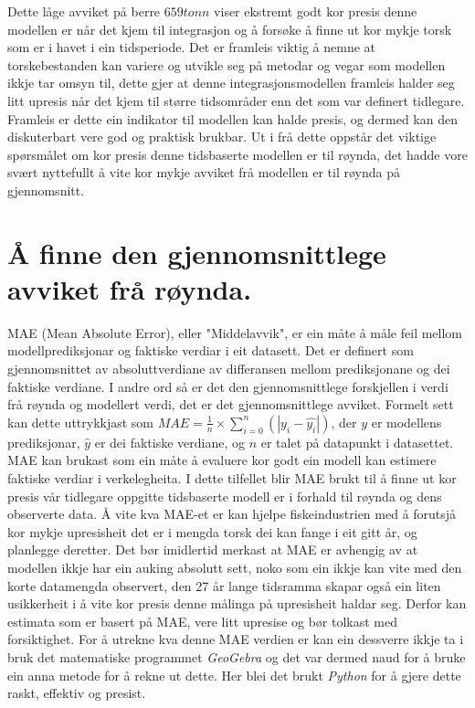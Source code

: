 \documentclass{report}
\begin{document}
Dette låge avviket på berre $659tonn$ viser ekstremt godt kor presis denne modellen er når det kjem til integrasjon og å forsøke å finne ut kor mykje torsk som er i havet i ein tidsperiode.
Det er framleis viktig å nemne at torskebestanden kan variere og utvikle seg på metodar og vegar som modellen ikkje tar omsyn til, dette gjer at denne integrasjonsmodellen framleis halder seg litt upresis når det kjem til større tidsområder enn det som var definert tidlegare.
Framleis er dette ein indikator til modellen kan halde presis, og dermed kan den diskuterbart vere god og praktisk brukbar.
Ut i frå dette oppstår det viktige spørsmålet om kor presis denne tidsbaserte modellen er til røynda, det hadde vore svært nyttefullt å vite kor mykje avviket frå modellen er til røynda på gjennomsnitt.
\section{Å finne den gjennomsnittlege avviket frå røynda.}
MAE (Mean Absolute Error), eller "Middelavvik", er ein måte å måle feil mellom modellprediksjonar og faktiske verdiar i eit datasett.
Det er definert som gjennomsnittet av absoluttverdiane av differansen mellom prediksjonane og dei faktiske verdiane.
I andre ord så er det den gjennomsnittlege forskjellen i verdi frå røynda og modellert verdi, det er det gjennomsnittlege avviket.
Formelt sett kan dette uttrykkjast som $MAE = \frac{1}{n}\times \sum_{i=0}^{n}(|y_i - \hat{y_i}|)$, der $y$ er modellens prediksjonar, $\hat{y}$ er dei faktiske verdiane, og $n$ er talet på datapunkt i datasettet.
MAE kan brukast som ein måte å evaluere kor godt ein modell kan estimere faktiske verdiar i verkelegheita.
I dette tilfellet blir MAE brukt til å finne ut kor presis vår tidlegare oppgitte tidsbaserte modell er i forhald til røynda og dens observerte data.
Å vite kva MAE-et er kan hjelpe fiskeindustrien med å forutsjå kor mykje upresisheit det er i mengda torsk dei kan fange i eit gitt år, og planlegge deretter.
Det bør imidlertid merkast at MAE er avhengig av at modellen ikkje har ein auking absolutt sett, noko som ein ikkje kan vite med den korte datamengda observert, den 27 år lange tidsramma skapar også ein liten usikkerheit i å vite kor presis denne målinga på upresisheit haldar seg.
Derfor kan estimata som er basert på MAE, vere litt upresise og bør tolkast med forsiktighet.
For å utrekne kva denne MAE verdien er kan ein dessverre ikkje ta i bruk det matematiske programmet \textit{GeoGebra} og det var dermed naud for å bruke ein anna metode for å rekne ut dette.
Her blei det brukt \textit{Python} for å gjere dette raskt, effektiv og presist.
\end{document}
